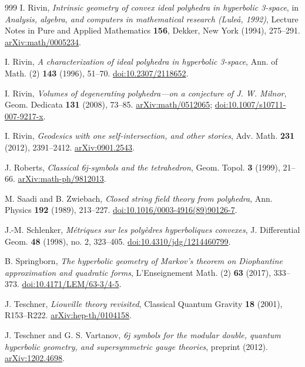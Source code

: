 \documentclass[11pt,a4paper]{article}
\numberwithin{equation}{section}
\theoremstyle{definition}
\theoremstyle{remark}
\begin{document}
\begin{thebibliography}{999}
I. Rivin,
\emph{Intrinsic geometry of convex ideal polyhedra in hyperbolic 3-space},
in \emph{Analysis, algebra, and computers in mathematical research
(Lule\aa, 1992)}, Lecture Notes in Pure and Applied Mathematics \textbf{156},
Dekker, New York (1994), 275--291.
\href{https://arxiv.org/abs/math/0005234}{arXiv:math/0005234}.

I. Rivin,
\emph{A characterization of ideal polyhedra in hyperbolic 3-space},
Ann. of Math. (2) \textbf{143} (1996), 51--70.
\href{https://doi.org/10.2307/2118652}{doi:10.2307/2118652}.

I. Rivin,
\emph{Volumes of degenerating polyhedra---on a conjecture of J. W. Milnor},
Geom. Dedicata \textbf{131} (2008), 73--85.
\href{https://arxiv.org/abs/math/0512065}{arXiv:math/0512065};
\href{https://doi.org/10.1007/s10711-007-9217-x}{doi:10.1007/s10711-007-9217-x}.

I. Rivin,
\emph{Geodesics with one self-intersection, and other stories},
Adv. Math. \textbf{231} (2012), 2391--2412.
\href{https://arxiv.org/abs/0901.2543}{arXiv:0901.2543}.

J. Roberts,
\emph{Classical 6j-symbols and the tetrahedron},
Geom. Topol. \textbf{3} (1999), 21--66.
\href{https://arxiv.org/abs/math-ph/9812013}{arXiv:math-ph/9812013}.

M. Saadi and B. Zwiebach,
\emph{Closed string field theory from polyhedra},
Ann. Physics \textbf{192} (1989), 213--227.
\href{https://doi.org/10.1016/0003-4916(89)90126-7}{doi:10.1016/0003-4916(89)90126-7}.

J.-M. Schlenker,
\emph{M\'etriques sur les poly\`edres hyperboliques convexes},
J. Differential Geom. \textbf{48} (1998), no. 2, 323--405.
\href{https://doi.org/10.4310/jdg/1214460799}{doi:10.4310/jdg/1214460799}.

B. Springborn,
\emph{The hyperbolic geometry of Markov's theorem on Diophantine
approximation and quadratic forms},
L'Enseignement Math. (2) \textbf{63} (2017), 333--373.
\href{https://doi.org/10.4171/LEM/63-3/4-5}{doi:10.4171/LEM/63-3/4-5}.

J. Teschner,
\emph{Liouville theory revisited},
Classical Quantum Gravity \textbf{18} (2001), R153--R222.
\href{https://arxiv.org/abs/hep-th/0104158}{arXiv:hep-th/0104158}.

J. Teschner and G. S. Vartanov,
\emph{6j symbols for the modular double, quantum hyperbolic geometry,
and supersymmetric gauge theories}, preprint (2012).
\href{https://arxiv.org/abs/1202.4698}{arXiv:1202.4698}.


\end{thebibliography}
\end{document}

